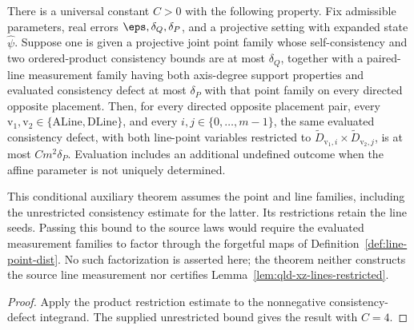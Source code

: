 \begin{theorem}
	\label{thm:conditional-restricted-lines-consistency}
	\leanok
	There is a universal constant $C>0$ with the following property. Fix
	admissible parameters, real errors $\eps,\delta_Q,\delta_P$, and a
	projective setting with expanded state $\hat\psi$. Suppose one is given a
	projective joint point family whose self-consistency and two ordered-product
	consistency bounds are at most $\delta_Q$, together with a paired-line
	measurement family having both axis-degree support properties and evaluated
	consistency defect at most $\delta_P$ with that point family on every
	directed opposite placement. Then, for every directed opposite placement
	pair, every $\mathrm{v}_1,\mathrm{v}_2\in\{\mathrm{ALine},\mathrm{DLine}\}$,
	and every $i,j\in\{0,\dots,m-1\}$, the same evaluated consistency defect,
	with both line-point variables restricted to
	$\widetilde D_{\mathrm{v}_1,i}\times
	\widetilde D_{\mathrm{v}_2,j}$, is at most
	$C m^2\delta_P$. Evaluation includes an additional undefined outcome when
	the affine parameter is not uniquely determined.

	This conditional auxiliary theorem assumes the point and line families,
	including the unrestricted consistency estimate for the latter. Its
	restrictions retain the line seeds. Passing this bound to the source laws
	would require the evaluated measurement families to factor through the
	forgetful maps of Definition~\ref{def:line-point-dist}. No such
	factorization is asserted here; the theorem neither constructs the source
	line measurement nor certifies
	Lemma~\ref{lem:qld-xz-lines-restricted}.
\end{theorem}
\begin{proof}
	\leanok
	Apply the product restriction estimate to the nonnegative consistency-defect
	integrand. The supplied unrestricted bound gives the result with $C=4$.
\end{proof}

